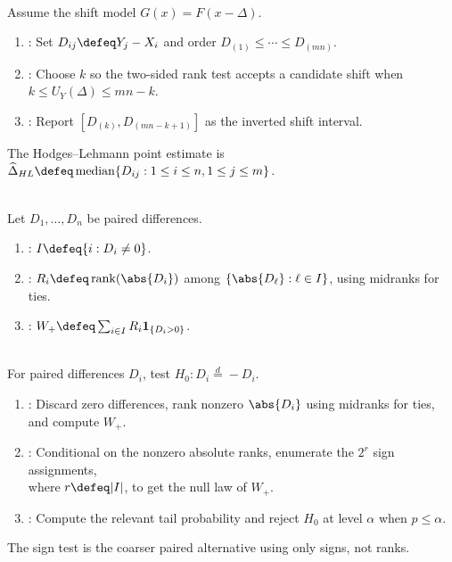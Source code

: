 \begin{method} \label{meth:mann-whitney-shift-interval} \\
Assume the shift model $G(x)=F(x-\Delta)$.
\begin{enumerate}[label=(\roman*)]
\setlength{\itemsep}{0pt}
\item {}: Set $D_{ij}\defeq Y_j-X_i$ and order $D_{(1)}\leq\cdots\leq D_{(mn)}$.
\item {}: Choose $k$ so the two-sided rank test accepts a candidate shift when $k\leq U_Y(\Delta)\leq mn-k$.
\item {}: Report $[D_{(k)},D_{(mn-k+1)}]$ as the inverted shift interval.
\end{enumerate}
The Hodges--Lehmann point estimate is $\widehat{\Delta}_{HL}\defeq\operatorname{median}\{D_{ij}:1\leq i\leq n,1\leq j\leq m\}$.
\end{method}

\begin{definition} \label{def:signed-rank-test-statistic} \\
Let $D_1,\ldots,D_n$ be paired differences.
\begin{enumerate}[label=(\roman*)]
\setlength{\itemsep}{0pt}
\item {}: $I\defeq\{i:D_i\neq0\}$.
\item {}: $R_i\defeq\operatorname{rank}(\abs{D_i})$ among $\{\abs{D_\ell}:\ell\in I\}$, using midranks for ties.
\item {}: $W_+\defeq\sum_{i\in I}R_i\mathbf{1}_{\{D_i>0\}}$.
\end{enumerate}
\end{definition}

\begin{method} \label{meth:signed-rank-test} \\
For paired differences $D_i$, test $H_0:D_i\stackrel{d}{=}-D_i$.
\begin{enumerate}[label=(\roman*)]
\setlength{\itemsep}{0pt}
\item {}: Discard zero differences, rank nonzero $\abs{D_i}$ using midranks for ties, and compute $W_+$.
\item {}: Conditional on the nonzero absolute ranks, enumerate the $2^r$ sign assignments,\\
where $r\defeq|I|$, to get the null law of $W_+$.
\item {}: Compute the relevant tail probability and reject $H_0$ at level $\alpha$ when $p\leq\alpha$.
\end{enumerate}
The sign test is the coarser paired alternative using only signs, not ranks.
\end{method}

